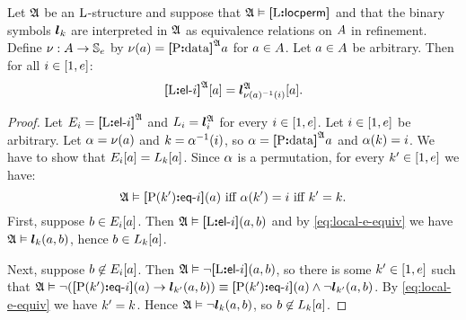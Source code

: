 \begin{remark}\label{rem:local-e-m}
Let $\mathfrak{A}$ be an ${\mathrm{L}}$-structure and suppose that $\mathfrak{A} \vDash {\bm{[}{\mathrm{L}}\mathord{\bm{:}}\mathsf{locperm}\bm{]}}$
and that the binary symbols $\bm{l}_{k}$ are interpreted in $\mathfrak{A}$ as equivalence
relations on $A$ in refinement.
Define $\nu : A \to \mathbb{S}_{e}$ by $\nu(a) = {\bm{[}{\mathrm{P}}\mathord{\bm{:}}\mathrm{data}\bm{]}}^{\mathfrak{A}}a$
for $a \in A$.
Let $a \in A$ be arbitrary.
Then for all $i \in [1,e]$:
\[
  {\bm{[}{\mathrm{L}}\mathord{\bm{:}}\mathsf{el}{\hbox{-}}i\bm{]}}^{\mathfrak{A}}[a] = \bm{l}_{\nu(a)^{-1}(i)}^{\mathfrak{A}}[a].
\]
\end{remark}
\begin{proof}
Let $E_{i} = {\bm{[}{\mathrm{L}}\mathord{\bm{:}}\mathsf{el}{\hbox{-}}i\bm{]}}^{\mathfrak{A}}$ and $L_{i} = \bm{l}_{i}^{\mathfrak{A}}$
for every $i \in [1,e]$.
Let $i \in [1,e]$ be arbitrary. 
Let $\alpha = \nu(a)$ and $k = \alpha^{-1}(i)$,
so $\alpha = {\bm{[}{\mathrm{P}}\mathord{\bm{:}}\mathrm{data}\bm{]}}^{\mathfrak{A}}a$ and $\alpha(k) = i$.
We have to show that $E_{i}[a] = L_{k}[a]$.
Since $\alpha$ is a permutation, for every ${k'} \in [1,e]$ we have:
\begin{equation}\label{eq:local-e-equiv}
  \mifff{
  \StrA \vDash \feqA{\PS(\kkp)}\ii(\ea)}{
  \perma(\kkp) = \ii}{ 
  \kkp = \kk}.
\end{equation}
First, suppose $b \in E_{i}[a]$.
Then $\mathfrak{A} \vDash {\bm{[}{\mathrm{L}}\mathord{\bm{:}}\mathsf{el}{\hbox{-}}i\bm{]}}(a,b)$ and by \cref{eq:local-e-equiv} we have
$\mathfrak{A} \vDash \bm{l}_{k}(a,b)$, hence $b \in L_{k}[a]$.

Next, suppose $b \not\in E_{i}[a]$.
Then $\mathfrak{A} \vDash \lnot{\bm{[}{\mathrm{L}}\mathord{\bm{:}}\mathsf{el}{\hbox{-}}i\bm{]}}(a,b)$, so there is some
${k'} \in [1,e]$ such that 
$\mathfrak{A} \vDash \lnot({\bm{[}{\mathrm{P}}({k'})\mathord{\bm{:}}\mathsf{eq}{\hbox{-}}i\bm{]}}(a) \rightarrow \bm{l}_{{k'}}(a,b)) 
\equiv {\bm{[}{\mathrm{P}}({k'})\mathord{\bm{:}}\mathsf{eq}{\hbox{-}}i\bm{]}}(a) \land \lnot\bm{l}_{{k'}}(a,b)$.
By \cref{eq:local-e-equiv} we have ${k'} = k$.
Hence $\mathfrak{A} \vDash \lnot \bm{l}_{k}(a,b)$, so $b \not\in L_{k}[a]$.
\end{proof}

